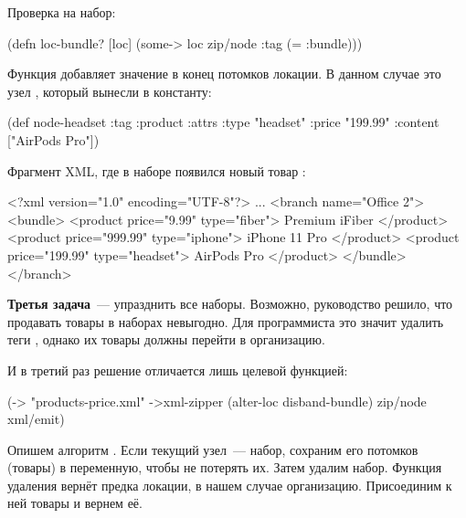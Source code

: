 Проверка на набор:

\begin{english}
  \begin{clojure}
(defn loc-bundle? [loc]
  (some-> loc zip/node :tag (= :bundle)))
  \end{clojure}
\end{english}

Функция  добавляет значение в конец потомков локации. В данном
случае это узел , который вынесли в константу:

\begin{english}
  \begin{clojure}
(def node-headset
  {:tag :product
   :attrs {:type "headset"
           :price "199.99"}
   :content ["AirPods Pro"]})
  \end{clojure}
\end{english}

Фрагмент XML, где в наборе появился новый товар :

\begin{english}
  \begin{xml/lines}
<?xml version="1.0" encoding="UTF-8"?>
...
  <branch name="Office 2">
    <bundle>
      <product price="9.99" type="fiber">
        Premium iFiber
      </product>
      <product price="999.99" type="iphone">
        iPhone 11 Pro
      </product>
      <product price="199.99" type="headset">
        AirPods Pro
      </product>
    </bundle>
  </branch>
  \end{xml/lines}
\end{english}

\textbf{Третья задача}~--- упразднить все наборы. Возможно, руководство решило,
что продавать товары в наборах невыгодно. Для программиста это значит удалить
теги , однако их товары должны перейти в организацию.

И в третий раз решение отличается лишь целевой функцией:

\begin{english}
  \begin{clojure}
(-> "products-price.xml"
    ->xml-zipper
    (alter-loc disband-bundle)
    zip/node
    xml/emit)
  \end{clojure}
\end{english}

Опишем алгоритм . Если текущий узел~--- набор, сохраним его
потомков (товары) в переменную, чтобы не потерять их. Затем удалим
набор. Функция удаления вернёт предка локации, в нашем случае
организацию. Присоединим к ней товары и вернем её.

